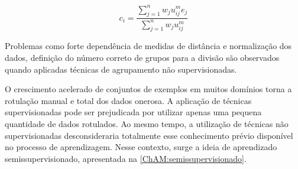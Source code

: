 \begin{equation}
	c_{i} = \frac{\sum_{j=1}^{n} w_{j}u_{ij}^{m}e_{j}}{\sum_{j=1}^{n} w_{j}u_{ij}^{m}}
	\label{eq:wfcmAtualizaC}
\end{equation}


Problemas como forte dependência de medidas de distância e normalização dos dados, definição do número correto de grupos para a divisão são observados quando aplicadas técnicas de agrupamento não supervisionadas.

O crescimento acelerado de conjuntos de exemplos em muitos domínios torna a rotulação manual e total dos dados onerosa. A aplicação de técnicas supervisionadas pode ser prejudicada por utilizar apenas uma pequena quantidade de dados rotulados. Ao mesmo tempo, a utilização de técnicas não supervisionadas desconsideraria totalmente esse conhecimento prévio disponível no processo de aprendizagem. Nesse contexto, surge a ideia de aprendizado semissupervisionado, apresentada na \autoref{ChAM:semissupervisionado}.